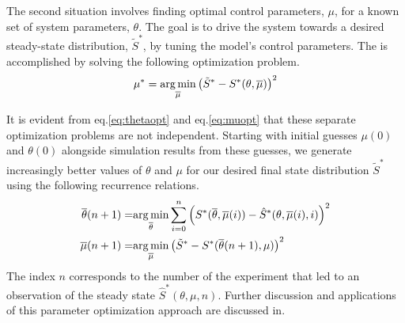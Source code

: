 \documentclass[Main.tex]{subfiles}
\begin{document}
The second situation involves finding optimal control parameters, $\mu$, for a known set of system parameters, $\theta$. The goal is to drive the system towards a desired steady-state distribution, $\tilde{S}^*$, by tuning the model's control parameters. The is accomplished by solving the following optimization problem.
\begin{equation}
	\mu^* = \underset{\overline{\mu}}{\operatorname*{arg\,min}}\left(\tilde{S}^* - S^*(\theta, \overline{\mu})\right)^2 \label{eq:muopt}
\end{equation}

It is evident from eq.\eqref{eq:thetaopt} and eq.\eqref{eq:muopt} that these separate optimization problems are not independent. Starting with initial guesses $\mu(0)$ and $\theta(0)$ alongside simulation results from these guesses, we generate increasingly better values of $\theta$ and $\mu$ for our desired final state distribution $\tilde{S}^*$ using the following recurrence relations.
\begin{align}\label{eq:paramrel}
	\overline{\theta}(n + 1) = & \underset{\overline{\theta}}{\operatorname*{arg\,min}}\sum\limits_{i=0}^{n}\left(S^*(\overline{\theta},\overline{\mu}(i)) - \hat{S}^*(\theta, \overline{\mu}(i), i)\right)^2\\
	\overline{\mu}(n + 1) = & \underset{\overline{\mu}}{\operatorname*{arg\,min}}\left(\tilde{S}^* - S^*(\overline{\theta}(n + 1), \mu)\right)^2
\end{align}
The index $n$ corresponds to the number of the experiment that led to an observation of the steady state $\hat{S}^*(\theta, \mu, n)$. Further discussion and applications of this parameter optimization approach are discussed in\cite{Correll2006a, Correll2008}.
\end{document}
